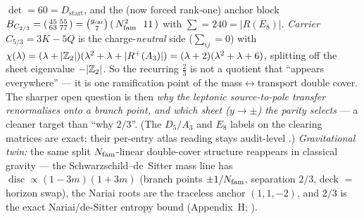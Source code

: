 \begin{keybox}
$\det=60=D_{\mathrm{start}}$, and the (now forced rank-one) anchor block
$B_{C_{2/3}}=\begin{psmallmatrix}45&55\\63&77\end{psmallmatrix}=\binom{\gcar}{7}\,(\,\Nfam^2\ \ 11\,)$ with
$\sum=240=|R(E_8)|$. \emph{Carrier} $C_{5/3}=3K-5Q$ is the charge-\emph{neutral} side ($\sum_{ij}=0$) with
$\chi(\lambda)=(\lambda+|\mathbb{Z}_2|)(\lambda^2+\lambda+|R^+(A_3)|)=(\lambda+2)(\lambda^2+\lambda+6)$, splitting off
the sheet eigenvalue $-|\mathbb{Z}_2|$. So the recurring $\tfrac23$ is not a quotient that ``appears everywhere'' --- it
is one ramification point of the mass$\leftrightarrow$transport double cover. The sharper open question is then
\emph{why the leptonic source-to-pole transfer renormalises onto a branch point, and which sheet ($y\to\pm$) the
parity selects} --- a cleaner target than ``why $2/3$''. (The $D_5/A_3$ and $E_8$ labels on the clearing matrices
are exact; their per-entry atlas reading stays audit-level \mC.) \emph{Gravitational twin:} the same split
$N_{\mathrm{fam}}$-linear double-cover structure reappears in classical gravity --- the Schwarzschild--de~Sitter mass
line has $\operatorname{disc}\propto(1-3m)(1+3m)$ (branch points $\pm1/N_{\mathrm{fam}}$, separation $2/3$, deck $=$
horizon swap), the Nariai roots are the traceless anchor $(1,1,-2)$, and $2/3$ is the exact Nariai/de-Sitter
entropy bound (Appendix~H; ).
\end{keybox}

